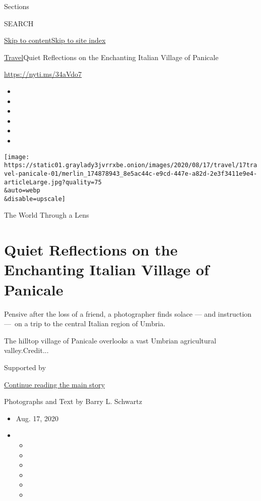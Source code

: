 Sections

SEARCH

\protect\hyperlink{site-content}{Skip to
content}\protect\hyperlink{site-index}{Skip to site index}

\href{/section/travel}{Travel}\textbar{}Quiet Reflections on the
Enchanting Italian Village of Panicale

\url{https://nyti.ms/34aVdo7}

\begin{itemize}
\item
\item
\item
\item
\item
\item
\end{itemize}

\texttt{[image: https://static01.graylady3jvrrxbe.onion/images/2020/08/17/travel/17travel-panicale-01/merlin\_174878943\_8e5ac44c-e9cd-447e-a82d-2e3f3411e9e4-articleLarge.jpg?quality=75\\\&auto=webp\\\&disable=upscale]}

The World Through a Lens

\hypertarget{quiet-reflections-on-the-enchanting-italian-village-of-panicale}{%
\section{Quiet Reflections on the Enchanting Italian Village of
Panicale}\label{quiet-reflections-on-the-enchanting-italian-village-of-panicale}}

Pensive after the loss of a friend, a photographer finds solace --- and
instruction ---~on a trip to the central Italian region of Umbria.

The hilltop village of Panicale overlooks a vast Umbrian agricultural
valley.Credit...

Supported by

\protect\hyperlink{after-sponsor}{Continue reading the main story}

Photographs and Text by Barry L. Schwartz

\begin{itemize}
\item
  Aug. 17, 2020
\item
  \begin{itemize}
  \item
  \item
  \item
  \item
  \item
  \item
  \end{itemize}
\end{itemize}

